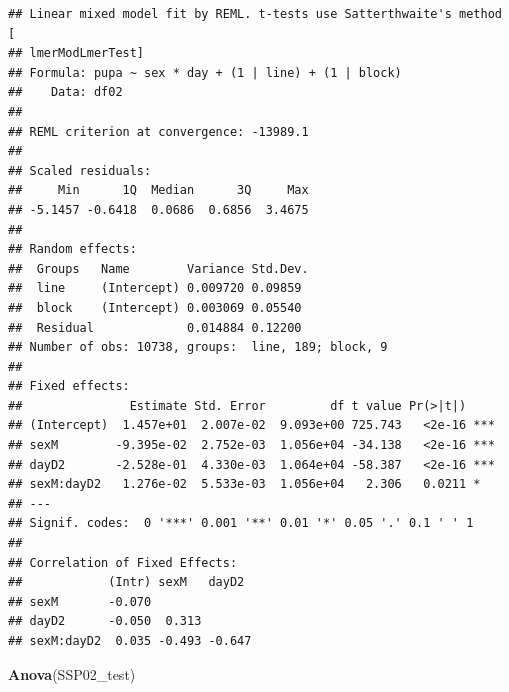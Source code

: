 \documentclass[
]{article}
\newenvironment{Shaded}{\begin{snugshade}}{\end{snugshade}}
\newcommand{\CommentTok}[1]{\textcolor[rgb]{0.56,0.35,0.01}{\textit{#1}}}
\newcommand{\DataTypeTok}[1]{\textcolor[rgb]{0.13,0.29,0.53}{#1}}
\newcommand{\DecValTok}[1]{\textcolor[rgb]{0.00,0.00,0.81}{#1}}
\newcommand{\KeywordTok}[1]{\textcolor[rgb]{0.13,0.29,0.53}{\textbf{#1}}}
\newcommand{\NormalTok}[1]{#1}
\newcommand{\OperatorTok}[1]{\textcolor[rgb]{0.81,0.36,0.00}{\textbf{#1}}}
\newcommand{\OtherTok}[1]{\textcolor[rgb]{0.56,0.35,0.01}{#1}}
\newcommand{\StringTok}[1]{\textcolor[rgb]{0.31,0.60,0.02}{#1}}
\begin{document}
\begin{Shaded}
\end{Shaded}

\begin{verbatim}
## Linear mixed model fit by REML. t-tests use Satterthwaite's method [
## lmerModLmerTest]
## Formula: pupa ~ sex * day + (1 | line) + (1 | block)
##    Data: df02
## 
## REML criterion at convergence: -13989.1
## 
## Scaled residuals: 
##     Min      1Q  Median      3Q     Max 
## -5.1457 -0.6418  0.0686  0.6856  3.4675 
## 
## Random effects:
##  Groups   Name        Variance Std.Dev.
##  line     (Intercept) 0.009720 0.09859 
##  block    (Intercept) 0.003069 0.05540 
##  Residual             0.014884 0.12200 
## Number of obs: 10738, groups:  line, 189; block, 9
## 
## Fixed effects:
##               Estimate Std. Error         df t value Pr(>|t|)    
## (Intercept)  1.457e+01  2.007e-02  9.093e+00 725.743   <2e-16 ***
## sexM        -9.395e-02  2.752e-03  1.056e+04 -34.138   <2e-16 ***
## dayD2       -2.528e-01  4.330e-03  1.064e+04 -58.387   <2e-16 ***
## sexM:dayD2   1.276e-02  5.533e-03  1.056e+04   2.306   0.0211 *  
## ---
## Signif. codes:  0 '***' 0.001 '**' 0.01 '*' 0.05 '.' 0.1 ' ' 1
## 
## Correlation of Fixed Effects:
##            (Intr) sexM   dayD2 
## sexM       -0.070              
## dayD2      -0.050  0.313       
## sexM:dayD2  0.035 -0.493 -0.647
\end{verbatim}

\begin{Shaded}
\begin{Highlighting}[]
\KeywordTok{Anova}\NormalTok{(SSP02_test)}
\end{Highlighting}
\end{Shaded}
\end{document}
